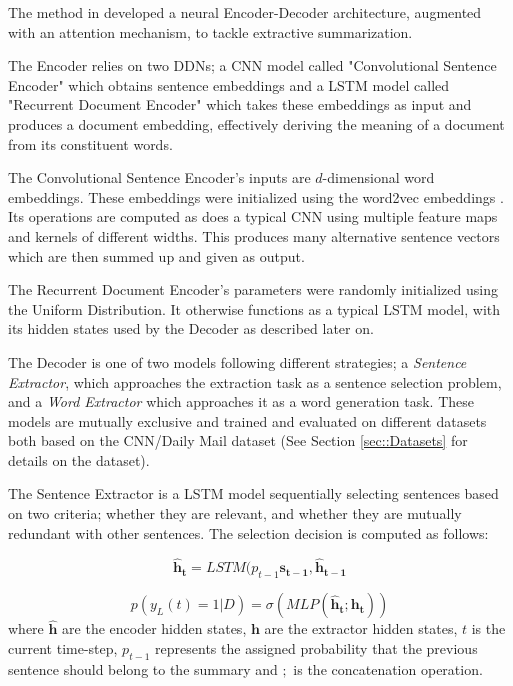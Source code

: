 \documentclass[preprint,review,12pt]{elsarticle}
\begin{document}
The method in \citet{lapata} developed a neural Encoder-Decoder architecture, augmented with an attention mechanism, to tackle extractive summarization. 

The Encoder relies on two DDNs; a CNN model called "Convolutional Sentence Encoder" which obtains sentence embeddings and a LSTM model called "Recurrent Document Encoder" which takes these embeddings as input and produces a document embedding, effectively deriving the meaning of a document from its constituent words. 

The Convolutional Sentence Encoder's inputs are $d$-dimensional word embeddings. These embeddings were initialized using the word2vec embeddings \cite{mikolov}. Its operations are computed as does a typical CNN using multiple feature maps and kernels of different widths. This produces many alternative sentence vectors which are then summed up and given as output.

The Recurrent Document Encoder's parameters were randomly initialized using the Uniform Distribution. It otherwise functions as a typical LSTM model, with its hidden states used by the Decoder as described later on.

The Decoder is one of two models following different strategies; a \textit{Sentence Extractor}, which approaches the extraction task as a sentence selection problem, and a \textit{Word Extractor} which approaches it as a word generation task. These models are mutually exclusive and trained and evaluated on different datasets both based on the CNN/Daily Mail dataset (See Section \ref{sec::Datasets} for details on the dataset).

The Sentence Extractor is a LSTM model sequentially selecting sentences based on two criteria; whether they are relevant, and whether they are mutually redundant with other sentences. The selection decision is computed as follows:

\begin{equation}
    \mathbf{\hat{h}_t} = LSTM(p_{t-1} \mathbf{s_{t-1}}, \mathbf{\hat{h}_{t-1}}
\end{equation}

\begin{equation}
    p(y_L(t) = 1 | D) = \sigma(MLP(\mathbf{\hat{h}_t}; \mathbf{h_t})) 
\end{equation}
where $\mathbf{\hat{h}}$ are the encoder hidden states, $\mathbf{h}$ are the extractor hidden states, $t$ is the current time-step, $p_{t-1}$ represents the assigned probability that the previous sentence should belong to the summary and $;$ is the concatenation operation.
\end{document}

